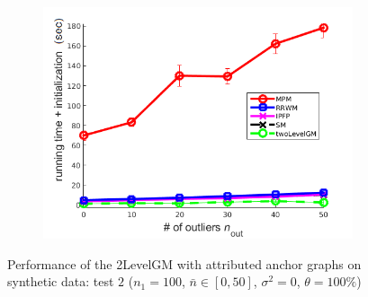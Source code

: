 \begin{figure}[h]
\begin{subfigure}[b]{0.33\textwidth}
		\includegraphics[scale=0.33]{"chapter3/fig/SyntheticTest/descr/Results_v4.3.3/Test3/time_summary_avg10t"} 
	\end{subfigure} 	
	\caption[Performance of the 2LevelGM with attributed anchor graphs on synthetic data (test $2$)]{Performance of the 2LevelGM with attributed anchor graphs on synthetic data: test $2$ ($n_1=100$, $\bar{n}\in[0,50]$, $\sigma^2=0$, $\theta=100\%$)}
	\label{fig:synTest2_descr_ver433}
\end{figure}
